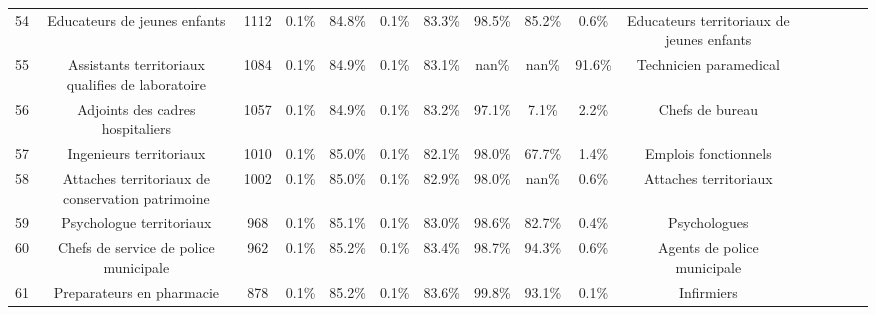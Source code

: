 \documentclass[10pt]{article}
\begin{document}
\begin{landscape}
\begin{longtable}{ | p{0.5cm} |*{15}{c|} }
54  &                       Educateurs de jeunes enfants &           1112 &           0.1\% &                  84.8\% &                 0.1\% &                    83.3\% &              98.5\% &                             85.2\% &                                     0.6\% &          Educateurs territoriaux de jeunes enfants \\
55  &   Assistants territoriaux qualifies de laboratoire &           1084 &           0.1\% &                  84.9\% &                 0.1\% &                    83.1\% &               nan\% &                              nan\% &                                    91.6\% &                             Technicien paramedical \\
56  &                   Adjoints des cadres hospitaliers &           1057 &           0.1\% &                  84.9\% &                 0.1\% &                    83.2\% &              97.1\% &                              7.1\% &                                     2.2\% &                                    Chefs de bureau \\
57  &                            Ingenieurs territoriaux &           1010 &           0.1\% &                  85.0\% &                 0.1\% &                    82.1\% &              98.0\% &                             67.7\% &                                     1.4\% &                               Emplois fonctionnels \\
58  &   Attaches territoriaux de conservation patrimoine &           1002 &           0.1\% &                  85.0\% &                 0.1\% &                    82.9\% &              98.0\% &                              nan\% &                                     0.6\% &                              Attaches territoriaux \\
59  &                           Psychologue territoriaux &            968 &           0.1\% &                  85.1\% &                 0.1\% &                    83.0\% &              98.6\% &                             82.7\% &                                     0.4\% &                                       Psychologues \\
60  &              Chefs de service de police municipale &            962 &           0.1\% &                  85.2\% &                 0.1\% &                    83.4\% &              98.7\% &                             94.3\% &                                     0.6\% &                        Agents de police municipale \\
61  &                          Preparateurs en pharmacie &            878 &           0.1\% &                  85.2\% &                 0.1\% &                    83.6\% &              99.8\% &                             93.1\% &                                     0.1\% &                                         Infirmiers \\

\end{longtable}
\end{landscape}
\end{document}

